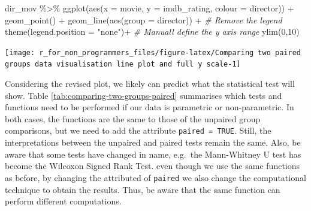 \documentclass[
]{book}
\newenvironment{Shaded}{\begin{snugshade}}{\end{snugshade}}
\newcommand{\AttributeTok}[1]{\textcolor[rgb]{0.77,0.63,0.00}{#1}}
\newcommand{\CommentTok}[1]{\textcolor[rgb]{0.56,0.35,0.01}{\textit{#1}}}
\newcommand{\DecValTok}[1]{\textcolor[rgb]{0.00,0.00,0.81}{#1}}
\newcommand{\FunctionTok}[1]{\textcolor[rgb]{0.00,0.00,0.00}{#1}}
\newcommand{\NormalTok}[1]{#1}
\newcommand{\SpecialCharTok}[1]{\textcolor[rgb]{0.00,0.00,0.00}{#1}}
\newcommand{\StringTok}[1]{\textcolor[rgb]{0.31,0.60,0.02}{#1}}
\begin{document}
\begin{Shaded}
\begin{Highlighting}[]
\NormalTok{dir\_mov }\SpecialCharTok{\%\textgreater{}\%}
  \FunctionTok{ggplot}\NormalTok{(}\FunctionTok{aes}\NormalTok{(}\AttributeTok{x =}\NormalTok{ movie, }\AttributeTok{y =}\NormalTok{ imdb\_rating, }\AttributeTok{colour =}\NormalTok{ director)) }\SpecialCharTok{+}
  \FunctionTok{geom\_point}\NormalTok{() }\SpecialCharTok{+}
  \FunctionTok{geom\_line}\NormalTok{(}\FunctionTok{aes}\NormalTok{(}\AttributeTok{group =}\NormalTok{ director)) }\SpecialCharTok{+}
  \CommentTok{\# Remove the legend}
  \FunctionTok{theme}\NormalTok{(}\AttributeTok{legend.position =} \StringTok{"none"}\NormalTok{)}\SpecialCharTok{+}
  \CommentTok{\# Manuall define the y axis range}
  \FunctionTok{ylim}\NormalTok{(}\DecValTok{0}\NormalTok{,}\DecValTok{10}\NormalTok{)}
\end{Highlighting}
\end{Shaded}

\begin{center}\texttt{[image: r\_for\_non\_programmers\_files/figure-latex/Comparing two paired groups data visualisation line plot and full y scale-1]} \end{center}

Considering the revised plot, we likely can predict what the statistical test will show. Table \ref{tab:comparing-two-groups-paired} summarises which tests and functions need to be performed if our data is parametric or non-parametric. In both cases, the functions are the same to those of the unpaired group comparisons, but we need to add the attribute \texttt{paired\ =\ TRUE}. Still, the interpretations between the unpaired and paired tests remain the same. Also, be aware that some tests have changed in name, e.g.~the Mann-Whitney U test has become the Wilcoxon Signed Rank Test. even though we use the same functions as before, by changing the attributed of \texttt{paired} we also change the computational technique to obtain the results. Thus, be aware that the same function can perform different computations.
\end{document}
